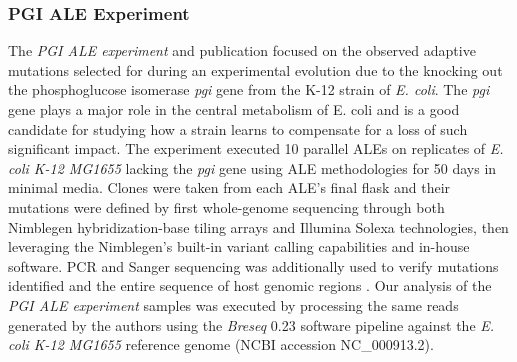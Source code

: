 \documentclass[12pt,final,masters,chapterheads]{ucsd}  %
\begin{document}
\subsubsection{PGI ALE Experiment}
%
%
The \textit{PGI ALE experiment} and publication focused on the observed adaptive mutations selected for during an experimental evolution due to the knocking out the phosphoglucose isomerase \textit{pgi} gene from the K-12 strain of \textit{E. coli}. The \textit{pgi} gene plays a major role in the central metabolism of E. coli and is a good candidate for studying how a strain learns to compensate for a loss of such significant impact. The experiment executed 10 parallel ALEs on replicates of \textit{E. coli K-12 MG1655} lacking the \textit{pgi} gene using ALE methodologies for 50 days in minimal media. Clones were taken from each ALE's final flask and their mutations were defined by first whole-genome sequencing through both Nimblegen hybridization-base tiling arrays and Illumina Solexa technologies, then leveraging the Nimblegen's built-in variant calling capabilities and in-house software. PCR and Sanger sequencing was additionally used to verify mutations identified and the entire sequence of host genomic regions \cite{10.1371/journal.pgen.1001186}. Our analysis of the \textit{PGI ALE experiment} samples was executed by processing the same reads generated by the authors using the \textit{Breseq} 0.23 software pipeline against the \textit{E. coli K-12 MG1655} reference genome (NCBI accession NC\_000913.2).
%
%
%
%
\end{document}

